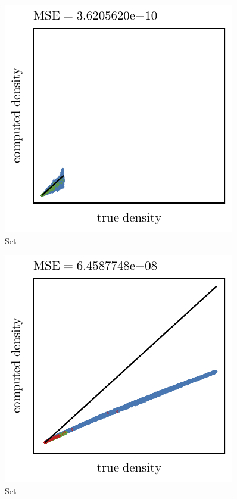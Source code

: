 
\begin{subfigure}{0.3\textwidth}
	\centering
	\includegraphics[keepaspectratio=true, width=\textwidth, height=0.23\textheight]{4/img/results_ferdosi_1_60000_mbe_breiman.pdf}
	\caption{Set \ferdosiOne}
	\label{fig:4:simulated:datasets:mbe:ferdosi1}
\end{subfigure}
\begin{subfigure}{0.3\textwidth}
	\centering
	\includegraphics[keepaspectratio=true, width=\textwidth, height=0.23\textheight]{4/img/results_ferdosi_2_60000_mbe_breiman.pdf}
	\caption{Set \ferdosiTwo}
	\label{fig:4:simulated:datasets:mbe:ferdosi2}
\end{subfigure}	
